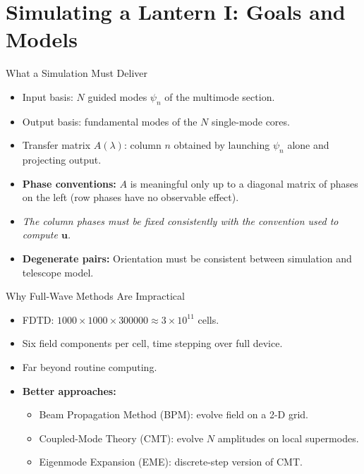 \documentclass[aspectratio=169,10pt]{beamer}
\begin{document}
\section{Simulating a Lantern I: Goals and Models}
\begin{frame}{What a Simulation Must Deliver}
\begin{itemize}
    \item Input basis: \(N\) guided modes \(\psi_n\) of the multimode section.
    \item Output basis: fundamental modes of the \(N\) single-mode cores.
    \item Transfer matrix \(A(\lambda)\): column \(n\) obtained by launching \(\psi_n\) alone and projecting output.
    \item \textbf{Phase conventions:} \(A\) is meaningful only up to a diagonal matrix of phases on the left (row phases have no observable effect).
    \item \emph{The column phases must be fixed consistently with the convention used to compute $\mathbf{u}$.}
    \item \textbf{Degenerate pairs:} Orientation must be consistent between simulation and telescope model.
\end{itemize}
\end{frame}

\begin{frame}{Why Full-Wave Methods Are Impractical}
\begin{itemize}
    \item FDTD: \(1000 \times 1000 \times 300000 \approx 3 \times 10^{11}\) cells.
    \item Six field components per cell, time stepping over full device.
    \item Far beyond routine computing.
    \item \textbf{Better approaches:}
    \begin{itemize}
        \item Beam Propagation Method (BPM): evolve field on a 2-D grid.
        \item Coupled-Mode Theory (CMT): evolve \(N\) amplitudes on local supermodes.
        \item Eigenmode Expansion (EME): discrete-step version of CMT.
    \end{itemize}
\end{itemize}
\end{frame}
\end{document}

